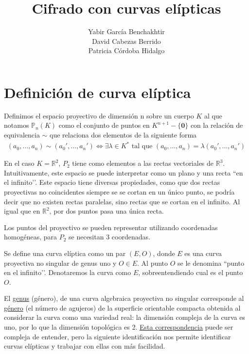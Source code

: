 \documentclass{article}
\begin{document}
\title{\Huge \textbf{Cifrado con curvas elípticas}} \author{Yabir
García Benchakhtir\\ David Cabezas Berrido\\ Patricia Córdoba Hidalgo
} \date{}
\maketitle
\tableofcontents

\newpage

\section{Definición de curva elíptica}

Definimos el espacio proyectivo de dimensión n sobre un cuerpo $K$ al
que notamos $\mathbb{P}_n(K)$ como el conjunto de puntos en
$K^{n+1}-\{\mathbf{0}\}$ con la relación de equivalencia $\sim$ que
relaciona dos elementos de la siguiente forma
    \begin{align*} (a_0,\dots,a_n) \sim (a_0',\dots,a_n') \iff \exists
\lambda\in K^* \text{ tal que } (a_0,\dots,a_n) = \lambda
(a_0',\dots,a_n')
    \end{align*}

En el caso $K=\mathbb{R}^2$, $P_2$ tiene como elementos a las rectas
vectoriales de $\mathbb{R}^3$. Intuitivamente, este espacio se puede
interpretar como un plano y una recta ``en el infinito’’. Este espacio
tiene diversas propiedades, como que dos rectas proyectivas no
coincidentes siempre se se cortan en un único punto, se podría decir
que no existen rectas paralelas, sino rectas que se cortan en el
infinito. Al igual que en $\mathbb{R}^2$, por dos puntos pasa una
única recta.

Los puntos del proyectivo se pueden representar utilizando coordenadas
homogéneas, para $P_2$ se necesitan 3 coordenadas.

Se define una curva elíptica como un par $(E, O)$, donde $E$ es una
curva proyectiva no singular de genus uno y $O \in E$. Al punto $O$ se
le denomina ``punto en el infinito’’. Denotaremos la curva como $E$,
sobreentendiendo cual es el punto $O$.

El
\href{https://en.wikipedia.org/wiki/Genus_(mathematics)#Algebraic_geometry}{genus}
(género), de una curva algebraica proyectiva no singular corresponde
al \href{https://en.wikipedia.org/wiki/Genus_(mathematics)}{género}
(el número de agujeros) de la superficie orientable compacta obtenida
al considerar la curva como una variedad real: la dimensión compleja
de la curva es uno, por lo que la dimensión topológica es
2. \href{https://es.wikipedia.org/wiki/Curva_algebraica#Curvas_complejas_y_superficies_reales}{Esta
correspondencia} puede ser compleja de entender, pero la siguiente
identificación nos permite identificar curvas elípticas y trabajar con
ellas con más facilidad.
\end{document}
